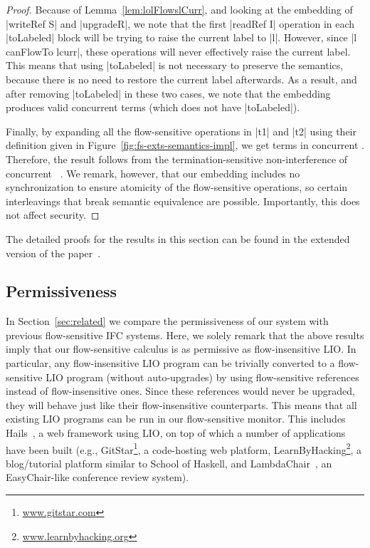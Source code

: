\begin{proof} Because of Lemma~\ref{lem:lolFlowslCurr}, and
  looking at the embedding of |writeRef S| and |upgradeR|, we note
  that the first |readRef I| operation in each |toLabeled| block will
  be trying to raise the current label to |l|. However, since |l
  canFlowTo lcurr|, these operations will never effectively raise the
  current label. This means that using |toLabeled| is not necessary to
  preserve the semantics, because there is no need to restore the
  current label afterwards. As a result, and after removing
  |toLabeled| in these two cases, we note that the embedding produces
  valid concurrent \lio{} terms (which does not have |toLabeled|).



  Finally, by expanding all the flow-sensitive operations in |t1| and |t2|
  using their definition given in
  Figure~\ref{fig:fs-exts-semantics-impl}, we get terms in concurrent
  \lio{}.  Therefore, the result follows from the
  termination-sensitive non-interference of concurrent
  \lio{}~\citep{stefan:addressing-covert}.
  We remark, however, that our embedding includes no synchronization to
  ensure atomicity of the flow-sensitive operations, so certain
  interleavings that break semantic equivalence are possible.
  Importantly, this does not affect security.
\end{proof}

The detailed proofs for the results in this section can be found in the
extended version of the paper~\cite{extended}.

\subsection{Permissiveness}
In Section~\ref{sec:related} we compare the permissiveness of our
system with previous flow-sensitive IFC systems. Here, we
solely remark that the above results imply that our
flow-sensitive calculus is as permissive as flow-insensitive
LIO. In particular, any flow-insensitive LIO program can be trivially
converted to a flow-sensitive LIO program (without auto-upgrades) by
using flow-sensitive references instead of flow-insensitive ones.
Since these references would never be upgraded, they will behave just
like their flow-insensitive counterparts.
%
This means that all existing LIO programs can be run in our
flow-sensitive monitor. This includes Hails~\cite{giffin:hails}, a
web framework using LIO, on top of which a number of applications
have been built (e.g., GitStar\footnote{\url{www.gitstar.com}}, a
code-hosting web platform,
LearnByHacking\footnote{\url{www.learnbyhacking.org}}, a
blog/tutorial platform similar to School of Haskell, and
LambdaChair~\cite{stefan:2012:arxiv-flexible}, an EasyChair-like
conference review system).


